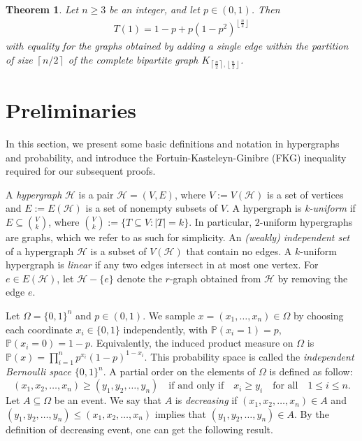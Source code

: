 \documentclass[11pt,a4paper]{article}
\newcommand{\bP}{\mathbb{P}}
\newtheorem{theorem}{Theorem}
\begin{document}
\begin{theorem}\label{thm:triangle}
Let $n\ge 3$ be an integer, and let $p\in(0,1)$. Then
\begin{align*}
T(1)=1-p+p(1-p^2)^{\left\lfloor \frac{n}{2}\right\rfloor}
\end{align*}
with equality for the graphs obtained by adding a single edge within   the partition  of size $\left\lceil n/2\right\rceil$ of the complete  bipartite graph $K_{\left\lceil \frac{n}{2}\right\rceil,\left\lfloor \frac{n}{2}\right\rfloor}$.
\end{theorem}

\section{Preliminaries}

In this section, we present some basic definitions and notation in hypergraphs and probability, and introduce the Fortuin-Kasteleyn-Ginibre (FKG) inequality \cite{For} required for our subsequent proofs.

A \emph{hypergraph} $\mathcal{H}$ is a pair $\mathcal{H} = (V , E)$, where $V:=V (\mathcal{H})$ is a set of vertices and $E:=E(\mathcal{H})$ is a set of nonempty subsets of $V$. A hypergraph is \emph{k-uniform} if $E \subseteq $$V \choose{ k}$, where ${V \choose k}:= \{ T \subseteq V : | T| = k\}$. In particular, $2$-uniform hypergraphs are  graphs, which we refer to as such for simplicity. An \emph{(weakly) independent set} of a hypergraph $\mathcal{H}$ is a subset of $V(\mathcal{H})$ that contain no edges. A $k$-uniform hypergraph is \emph{linear} if any two edges intersect in at most one vertex.
For $e\in  E(\mathcal{H})$, let $\mathcal{H}-\{e\}$ denote the $r$-graph obtained from $\mathcal{H}$ by removing the edge $e$.

Let $\Omega=\{0,1\}^n$ and $p \in (0, 1)$. We sample $x=(x_1,\dots,x_n)\in\Omega$ by choosing each coordinate
$x_i\in\{0,1\}$ independently, with $\bP(x_i=1)=p$, $\bP(x_i=0)=1-p$.
Equivalently, the induced product measure on $\Omega$ is $\bP(x)=\prod_{i=1}^n p^{x_i}(1-p)^{1-x_i}$.
This probability space is called the \emph{independent Bernoulli space $\{0,1\}^n$}.
A partial order on the elements of  $\Omega$ is defined as follow:
\[
(x_1, x_2, \dots, x_n) \geq (y_1, y_2, \dots, y_n)  \quad \text{if and only if} \quad x_i \geq y_i \quad \text{for all}  \quad1 \leq i \leq n.
\]
Let $A \subseteq \Omega$ be an event. 
We say that $A$ is \emph{decreasing} if $(x_1, x_2, \dots, x_n) \in A$ and  $ (y_1, y_2, \dots, y_n) \leq (x_1, x_2, \dots, x_n)$ implies that $ (y_1, y_2, \dots, y_n) \in A$. By the  definition of decreasing event, one can get the following result.
\end{document}
